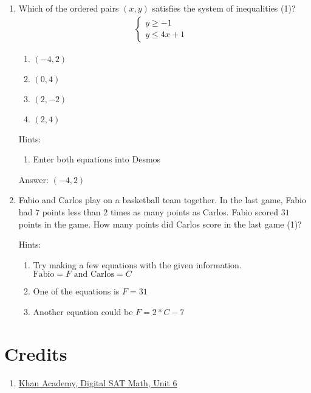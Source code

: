 \documentclass{article}
\begin{document}
\begin{enumerate}
{	      Answer: c
	      }

	\item {
	      Which of the ordered pairs $(x,y)$ satisfies the system of inequalities (1)?
	      \[
		      \begin{array}{l}
			      \begin{cases}
				      y \geq -1 & \\
				      y \leq 4x + 1
			      \end{cases}
		      \end{array}\]

	      \begin{enumerate}
		      \item{$(-4,2)$}
		      \item{$(0,4)$}
		      \item{$(2,-2)$}
		      \item{$(2,4)$}
	      \end{enumerate}

	      Hints:
	      \begin{enumerate}
		      \item{Enter both equations into Desmos}
	      \end{enumerate}

	      Answer: $(-4,2)$
	      }

	\item {Fabio and Carlos play on a basketball team together. In the last game, Fabio had $7$ points less than $2$ times as many points as Carlos. Fabio scored $31$ points in the game. How many points did Carlos score in the last game (1)?

	      Hints:
	      \begin{enumerate}
		      \item {Try making a few equations with the given information. \(\text{Fabio}=F\text{ and Carlos}=C\)}
		      \item {One of the equations is \(F=31\)}
		      \item {Another equation could be \(F=2*C-7\)}
	      \end{enumerate}
	      }



\end{enumerate}

\section{Credits}
\begin{enumerate}

	\item{
	      \href{https://www.khanacademy.org/test-prep/v2-sat-math/x0fcc98a58ba3bea7:algebra-medium}{Khan Academy, Digital SAT Math, Unit 6}}

\end{enumerate}
\end{document}
